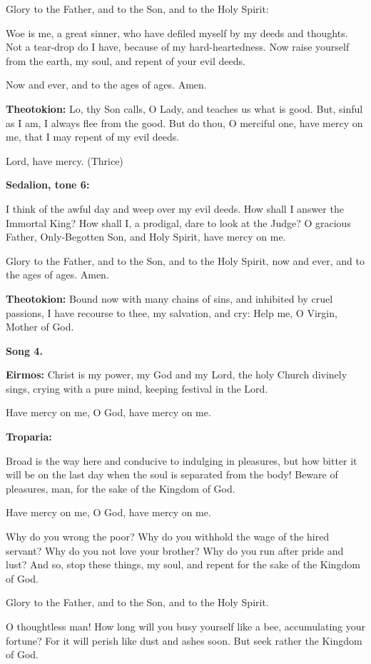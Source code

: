 Glory to the Father, and to the Son, and to the Holy Spirit:

Woe is me, a great sinner, who have defiled myself by my deeds and
thoughts. Not a tear-drop do I have, because of my hard-heartedness. Now
raise yourself from the earth, my soul, and repent of your evil deeds.

Now and ever, and to the ages of ages. Amen.

\textbf{Theotokion:} Lo, thy Son calls, O Lady, and teaches us what is
good. But, sinful as I am, I always flee from the good. But do thou, O
merciful one, have mercy on me, that I may repent of my evil deeds.

Lord, have mercy. (Thrice)

\textbf{Sedalion, tone 6:}

I think of the awful day and weep over my evil deeds. How shall I answer
the Immortal King? How shall I, a prodigal, dare to look at the Judge? O
gracious Father, Only-Begotten Son, and Holy Spirit, have mercy on me.

Glory to the Father, and to the Son, and to the Holy Spirit, now and
ever, and to the ages of ages. Amen.

\textbf{Theotokion:} Bound now with many chains of sins, and inhibited
by cruel passions, I have recourse to thee, my salvation, and cry: Help
me, O Virgin, Mother of God.

\textbf{Song 4.}

\textbf{Eirmos:} Christ is my power, my God and my Lord, the holy Church
divinely sings, crying with a pure mind, keeping festival in the Lord.

Have mercy on me, O God, have mercy on me.

\textbf{Troparia:}

Broad is the way here and conducive to indulging in pleasures, but how
bitter it will be on the last day when the soul is separated from the
body! Beware of pleasures, man, for the sake of the Kingdom of God.

Have mercy on me, O God, have mercy on me.

Why do you wrong the poor? Why do you withhold the wage of the hired
servant? Why do you not love your brother? Why do you run after pride
and lust? And so, stop these things, my soul, and repent for the sake of
the Kingdom of God.

Glory to the Father, and to the Son, and to the Holy Spirit.

O thoughtless man! How long will you busy yourself like a bee,
accumulating your fortune? For it will perish like dust and ashes soon.
But seek rather the Kingdom of God.

